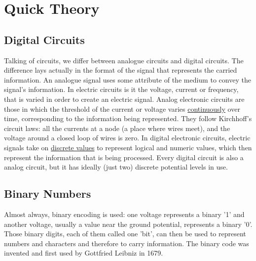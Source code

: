 

\section{Quick Theory}
\subsection{Digital Circuits}
Talking of circuits, we differ between analogue circuits and digital circuits. The difference lays actually in the format of the signal that represents the carried information. \newline
An analogue signal uses some attribute of the medium to convey the signal's information. In electric circuits is it the voltage, current or frequency, that is varied in order to create an electric signal. Analog electronic circuits are those in which the threshold of the current or voltage varies \underline{continuously} over time, corresponding to the information being represented. They follow Kirchhoff's circuit laws: all the currents at a node (a place where wires meet), and the voltage around a closed loop of wires is zero. \newline
In digital electronic circuits, electric signals take on \underline{discrete values} to represent logical and numeric values, which then represent the information that is being processed. Every digital circuit is also a analog circuit, but it has ideally (just two) discrete potential levels in use. 

\subsection{Binary Numbers}
Almost always, binary encoding is used: one voltage represents a binary '1' and another voltage, usually a value near the ground potential, represents a binary '0'. Those binary digits, each of them called one 'bit', can then be used to represent numbers and characters and therefore to carry information. The binary code was invented and first used by Gottfried Leibniz in 1679.

